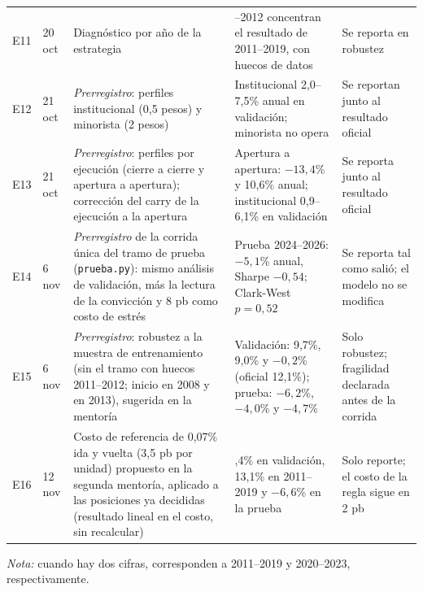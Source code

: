 \documentclass[11pt,a4paper]{article}
\begin{document}
\begin{table}[htbp]
\begin{tabularx}{\textwidth}{@{}l l >{\raggedright\arraybackslash}X >{\raggedright\arraybackslash}X >{\raggedright\arraybackslash}X@{}}
E11 & 20 oct & Diagnóstico por año de la estrategia & 2011--2012 concentran el resultado de 2011--2019, con huecos de datos & Se reporta en robustez \\
E12 & 21 oct & \emph{Prerregistro}: perfiles institucional (0,5 pesos) y minorista (2 pesos) & Institucional 2,0--7,5\% anual en validación; minorista no opera & Se reportan junto al resultado oficial \\
E13 & 21 oct & \emph{Prerregistro}: perfiles por ejecución (cierre a cierre y apertura a apertura); corrección del carry de la ejecución a la apertura & Apertura a apertura: $-13{,}4$\% y 10,6\% anual; institucional 0,9--6,1\% en validación & Se reporta junto al resultado oficial \\
E14 & 6 nov & \emph{Prerregistro} de la corrida única del tramo de prueba (\texttt{prueba.py}): mismo análisis de validación, más la lectura de la convicción y 8 pb como costo de estrés & Prueba 2024--2026: $-5{,}1$\% anual, Sharpe $-0{,}54$; Clark-West \(p=0{,}52\) & Se reporta tal como salió; el modelo no se modifica \\
E15 & 6 nov & \emph{Prerregistro}: robustez a la muestra de entrenamiento (sin el tramo con huecos 2011--2012; inicio en 2008 y en 2013), sugerida en la mentoría & Validación: 9,7\%, 9,0\% y $-0{,}2$\% (oficial 12,1\%); prueba: $-6{,}2$\%, $-4{,}0$\% y $-4{,}7$\% & Solo robustez; fragilidad declarada antes de la corrida \\
E16 & 12 nov & Costo de referencia de 0,07\% ida y vuelta (3,5 pb por unidad) propuesto en la segunda mentoría, aplicado a las posiciones ya decididas (resultado lineal en el costo, sin recalcular) & 10,4\% en validación, 13,1\% en 2011--2019 y $-6{,}6$\% en la prueba & Solo reporte; el costo de la regla sigue en 2 pb \\
\bottomrule
\end{tabularx}
\begin{tablenotes}\footnotesize
\item \emph{Nota:} cuando hay dos cifras, corresponden a 2011--2019 y 2020--2023, respectivamente.
\end{tablenotes}
\end{table}
\end{document}
